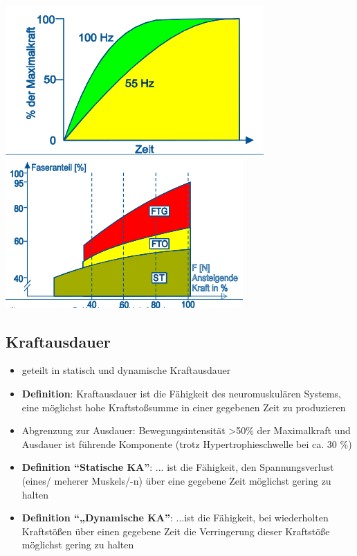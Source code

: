 \begin{minipage}{0.4\textwidth}
    \includegraphics[width=\textwidth]{pictures/frequenzierung}
    \includegraphics[width=\textwidth]{pictures/rekrutierung}
\end{minipage}

\subsection{Kraftausdauer}

\begin{itemize}
    \item geteilt in statisch und dynamische Kraftausdauer
    \item \textbf{Definition}: Kraftausdauer ist die Fähigkeit des neuromuskulären Systems, eine möglichst hohe Kraftstoßsumme in einer gegebenen Zeit zu produzieren
    \item Abgrenzung zur Ausdauer: Bewegungsintensität >50\% der Maximalkraft und Ausdauer ist führende Komponente (trotz Hypertrophieschwelle bei ca. 30 \%)
    \item \textbf{Definition ``Statische KA''}: ... ist die Fähigkeit, den Spannungsverlust (eines/ meherer Muskels/-n) über eine gegebene Zeit möglichst gering zu halten
    \item \textbf{Definition ``„Dynamische KA''}: ...ist die Fähigkeit, bei wiederholten Kraftstößen über einen gegebene Zeit die Verringerung dieser Kraftstöße möglichst gering zu halten
\end{itemize}

